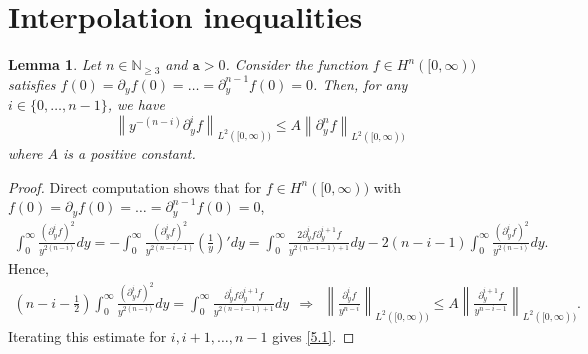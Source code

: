 \documentclass{article}
\newcommand{\norm}[1]{\left\lVert#1\right\rVert}
\newcommand{\pa}{\partial}
\def\be{\begin{equation}}
\def\ee{\end{equation}}
\numberwithin{equation}{section}
\newtheorem{lemma}[theorem]{Lemma}
\begin{document}
\section{Interpolation inequalities}
\begin{lemma}\label{hardy 1}
	Let $n\in \mathbb N_{\geq 3}$ and $\mathtt a>0$. Consider the function $f\in H^n([0,\infty))$ satisfies $f(0)=\pa_yf(0)=\dots=\pa_y^{n-1}f(0)=0$. Then, for any $i\in\{0,\dots,n-1\}$, we have
	\be\label{5.1}
		\norm{y^{-(n-i)} \pa_y^i f}_{L^2([0, \infty))} \leq  A\norm{\pa_y^n f}_{L^2([0, \infty))}
	\ee
	where $A$ is a positive constant.
\end{lemma}
\begin{proof}
    Direct computation shows that for $ f\in H^n([0,\infty))$ with $f(0)=\pa_yf(0)=\dots=\pa_y^{n-1}f(0)=0$,
    \begin{align*}
        \int_0^\infty \frac{(\pa_y^i f)^2}{y^{2(n-i)}} dy =- \int_0^\infty \frac{(\pa_y^i f)^2}{y^{2(n-i-1)}} (\frac{1}{y})' dy = \int_0^\infty \frac{2\pa_y^i f\pa_y^{i+1} f}{y^{2(n-i-1)+1}}  dy -2(n-i-1)  \int_0^\infty \frac{(\pa_y^i f)^2}{y^{2(n-i)}} dy.
    \end{align*}
    Hence,
    \begin{align*}
        (n-i-\frac12)  \int_0^\infty \frac{(\pa_y^i f)^2}{y^{2(n-i)}} dy = \int_0^\infty \frac{\pa_y^i f\pa_y^{i+1} f}{y^{2(n-i-1)+1}}  dy \ \ \Rightarrow \ \  \norm{\frac{\pa_y^i f}{y^{n-i}}}_{L^2([0,\infty))} \leq A \norm{\frac{\pa_y^{i+1} f}{y^{n-i-1}}}_{L^2([0,\infty))}. 
    \end{align*}  
    Iterating this estimate for $i,i+1,\dots,n-1$ gives \eqref{5.1}.
\end{proof}
\end{document}
